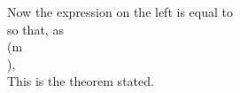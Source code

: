 Now the expression on the left is equal to
\\[ \begin{align*}
  \int_{-\pi}^{\pi}\!
  \left\{
    f(x)
  \right\}^{2} \, d x
  -&
  2
  \int_{-\pi}^{\pi}\!
  \left\{
    f(x)
    -
    \sum_{n=0}^{m-1}
    A_{n}(x)
  \right\}
  \cdot
  \left\{
    \sum_{n=0}^{m-1}
    A_{n}(x)
  \right\}
  \, d x
  \\
  &\quad\quad
  \int_{-\pi}^{\pi}\!
  \left\{
    \sum_{n=0}^{m-1}
    A_{n}(x)
  \right\}^{2}
  \, d x
  \\
  =&
  \int_{-\pi}^{\pi}\!
  \left\{
    f(x)
  \right\}^{2}
  \, d x
  -
  \int_{-\pi}^{\pi}\!
  \left\{
    \sum_{n=0}^{m-1}
    A_{n}(x)
  \right\}^{2}
  \, d x
  \\
  =&
  \int_{-\pi}^{\pi}\!
  \left\{
    f(x)
  \right\}^{2}
  \, d x
  -
  \pi
  \left\{
    \frac{1}{2} a_{0}^{2}
    +
    \sum_{n=1}^{m-1}
    (a_{n}^{2} + b_{n}^{2})
  \right\}
  ,
\end{align*} \\]
so that, as \\(m \rightarrow \infty\\),
\\[ 
\int_{-\pi}^{\pi}\!
\left\{
  f(x)
\right\}^{2}
\, d x
-
\pi
\left\{
  \frac{1}{2} a_{0}^{2}
  +
  \sum_{n=1}^{m-1}
  (a_{n}^{2} + b_{n}^{2})
\right\}
\rightarrow
0.
\\] 
This is the theorem stated.

